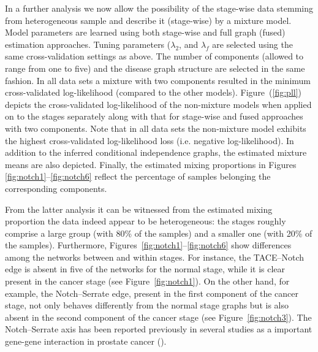 \documentclass[10pt]{article}
\begin{document}
In a further analysis we now allow the possibility of the stage-wise data stemming from heterogeneous sample and describe it (stage-wise) by a mixture model. Model parameters are learned using both stage-wise and full graph (fused) estimation approaches. Tuning parameters ($\lambda_2$, and $\lambda_f$ are selected using the same cross-validation settings as above. The number of components (allowed to range from one to five) and the disease graph structure are selected in the same fashion. In all data sets a mixture with two components resulted in the minimum cross-validated log-likelihood (compared to the other models). Figure~(\ref{fig:pll}) depicts the cross-validated log-likelihood of the non-mixture models when applied on to the stages separately along with that for stage-wise and fused approaches with two components. Note that in all data sets the non-mixture model exhibits the highest cross-validated log-likelihood loss (i.e. negative log-likelihood). In addition to the inferred conditional independence graphs, the estimated mixture means are also depicted. Finally, the estimated mixing proportions in Figures \ref{fig:notch1}--\ref{fig:notch6} reflect the percentage of samples belonging the corresponding components. 


From the latter analysis it can be witnessed from the estimated mixing proportion the data indeed appear to be heterogeneous: the stages roughly comprise a large group (with 80\% of the samples) and a smaller one (with 20\% of the samples). Furthermore, Figures~\ref{fig:notch1}--\ref{fig:notch6} show differences among the networks between and within stages. For instance, the TACE--Notch edge is absent in five of the networks for the normal stage, while it is clear present in the cancer stage (see Figure~\ref{fig:notch1}). On the other hand, for example, the Notch--Serrate edge, present in the first component of the cancer stage, not only behaves differently from the normal stage graphs but is also absent in the second component of the cancer stage (see Figure~\ref{fig:notch3}). The Notch--Serrate axis has been reported previously in several studies as a important gene-gene interaction in prostate cancer (\cite{zhu2013elevated,carvalho2014notch}).
\end{document}
